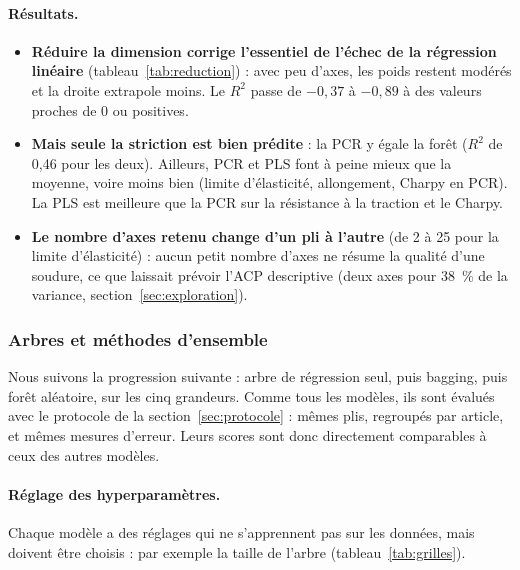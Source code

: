 \paragraph{Résultats.}
\begin{itemize}
  \item \textbf{Réduire la dimension corrige l'essentiel de l'échec de la régression
    linéaire} (tableau~\ref{tab:reduction}) : avec peu d'axes, les poids restent modérés et
    la droite extrapole moins. Le $R^2$ passe de $-0{,}37$ à $-0{,}89$ à des valeurs proches
    de 0 ou positives.
  \item \textbf{Mais seule la striction est bien prédite} : la PCR y égale la
    forêt ($R^2$ de 0,46 pour les deux). Ailleurs, PCR et PLS font à peine mieux que la moyenne, voire moins
    bien (limite d'élasticité, allongement, Charpy en PCR). La PLS est meilleure que la PCR
    sur la résistance à la traction et le Charpy.
  \item \textbf{Le nombre d'axes retenu change d'un pli à l'autre} (de 2 à 25 pour la
    limite d'élasticité) : aucun petit nombre d'axes ne résume la qualité d'une soudure,
    ce que laissait prévoir l'ACP descriptive (deux axes pour \SI{38}{\percent} de la
    variance, section~\ref{sec:exploration}).
\end{itemize}


\subsubsection{Arbres et méthodes d'ensemble}

Nous suivons la progression suivante : arbre de régression seul, puis bagging, puis
forêt aléatoire, sur les cinq grandeurs. Comme tous les modèles, ils sont évalués avec le
protocole de la section~\ref{sec:protocole} : mêmes plis, regroupés par article, et
mêmes mesures d'erreur. Leurs scores sont donc directement comparables à ceux des autres
modèles.

\paragraph{Réglage des hyperparamètres.} Chaque modèle a des réglages qui ne
s'apprennent pas sur les données, mais doivent être choisis : par exemple la taille de
l'arbre (tableau~\ref{tab:grilles}).

